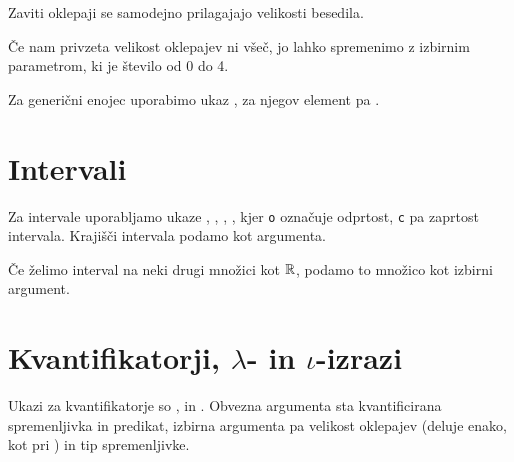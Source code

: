 Zaviti oklepaji se samodejno prilagajajo velikosti besedila.

Če nam privzeta velikost oklepajev ni všeč, jo lahko spremenimo z izbirnim parametrom, ki je število od 0 do 4.

Za generični enojec uporabimo ukaz , za njegov element pa .

\section*{Intervali}


Za intervale uporabljamo ukaze , , , , kjer \texttt{o} označuje odprtost, \texttt{c} pa zaprtost intervala. Krajišči intervala podamo kot argumenta.

Če želimo interval na neki drugi množici kot $\mathbb{R}$, podamo to množico kot izbirni argument.

\section*{Kvantifikatorji, $\lambda$- in $\iota$-izrazi}


Ukazi za kvantifikatorje so ,  in . Obvezna argumenta sta kvantificirana spremenljivka in predikat, izbirna argumenta pa velikost oklepajev (deluje enako, kot pri ) in tip spremenljivke.

